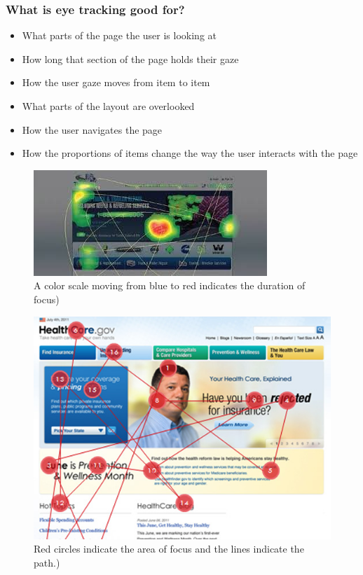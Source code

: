 \begin{frame}
	\frametitle{What is eye tracking good for?}
	\begin{itemize}
		\item What parts of the page the user is looking at
		\item How long that section of the page holds their gaze
		\item How the user gaze moves from item to item
		\item	What parts of the layout are overlooked
		\item How the user navigates the page
		\item How the proportions of items change the way the user interacts with the page
	\end{itemize}
\end{frame}

\begin{frame}

	\begin{figure}
		\includegraphics[scale=.8]{assets/heat} 
		\caption{A color scale moving from blue to red indicates the duration of focus)}
	\end{figure}
\end{frame}

\begin{frame}
	\begin{figure}
		\includegraphics[scale=.5]{assets/saccade} 
		\caption{Red circles indicate the area of focus and the lines indicate the path.)}
	\end{figure}
\end{frame}

